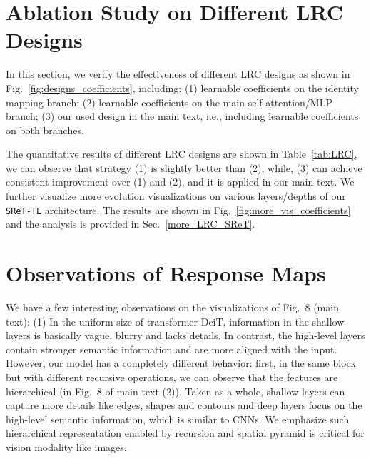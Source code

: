 \documentclass[runningheads]{llncs}
\begin{document}
	\section{Ablation Study on Different LRC Designs} \label{ablation_LRC}
	
	In this section, we verify the effectiveness of different LRC designs as shown in Fig.~\ref{fig:designs_coefficients}, including: (1) learnable coefficients on the identity mapping branch; (2) learnable coefficients on the main self-attention/MLP branch; (3) our used design in the main text, i.e., including learnable coefficients on both branches.
	
	The quantitative results of different LRC designs are shown in Table~\ref{tab:LRC}, we can observe that strategy (1) is slightly better than (2), while, (3) can achieve consistent improvement over (1) and (2), and it is applied in our main text. We further visualize more evolution visualizations on various layers/depths of our \texttt{SReT-TL} architecture. The results are shown in Fig.~\ref{fig:more_vis_coefficients} and the analysis is provided in Sec.~\ref{more_LRC_SReT}.
	
	\begin{table}[h]
		\centering
		\caption{Ablation study on different LRC designs.}
		\label{tab:LRC}
	\end{table}
	
	
	\section{Observations of Response Maps} \label{obs_res}
	
	We have a few interesting observations on the visualizations of Fig.~8 (main text): (1) In the uniform size of transformer DeiT, information in the shallow layers is basically vague, blurry and lacks details. In contrast, the high-level layers contain stronger semantic information and are more aligned with the input. However, our model has a completely different behavior: first, in the same block but with different recursive operations, we can observe that the features are hierarchical (in Fig.~8 of main text (2)). Taken as a whole, shallow layers can capture more details like edges, shapes and contours and deep layers focus on the high-level semantic information, which is similar to CNNs. We emphasize such hierarchical representation enabled by recursion and spatial pyramid is critical for vision modality like images.
	
\end{document}
